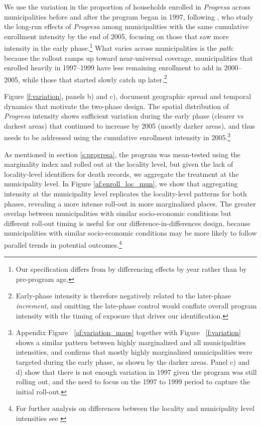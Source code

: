 \documentclass[12pt]{article}
\begin{document}
\p We use the variation in the proportion of households enrolled in \textit{Progresa} across municipalities before and after the program began in 1997, following \cite{parker2023conditional}, who study the long-run effects of \textit{Progresa} among municipalities with the same cumulative enrollment intensity by the end of 2005, focusing on those that saw more intensity in the early phase.\footnote{Our specification differs from \citet{parker2023conditional} by differencing effects by year rather than by pre-program age.}  What varies across municipalities is the \textit{path}: because the rollout ramps up toward near-universal coverage, municipalities that enrolled heavily in 1997--1999 have less remaining enrollment to add in 2000--2005, while those that started slowly catch up later.\footnote{Early-phase intensity is therefore negatively related to the later-phase \textit{increment}, and omitting the late-phase control would conflate overall program intensity with the timing of exposure that drives our identification.}


\p Figure \ref{f:variation}, panels b) and c), document geographic spread and temporal dynamics that motivate the two-phase design. The spatial distribution of \textit{Progresa} intensity shows sufficient variation during the early phase (clearer vs darkest areas) that continued to increase by 2005 (mostly darker areas), and thus needs to be addressed using the cumulative enrollment intensity in 2005.\footnote{Appendix Figure ~\ref{af:variation_maps} together with Figure ~\ref{f:variation} shows a similar pattern between highly marginalized and all municipalities intensities, and confirms that mostly highly marginalized municipalities were targeted during the early phase, as shown by the darker areas. Panel c) and d) show that there is not enough variation in 1997 given the program was still rolling out, and the need to focus on the 1997 to 1999 period to capture the initial roll-out.} 

\p As mentioned in section \ref{s:progresa}, the program was mean-tested using the marginality index and rolled out at the locality level, but given the lack of locality-level identifiers for death records, we aggregate the treatment at the municipality level. In Figure \ref{af:enroll_loc_mun}, we show that aggregating intensity at the municipality level replicates 
the locality-level patterns for both phases, revealing a more intense roll-out in more marginalized places. The greater overlap between municipalities with similar socio-economic conditions but different roll-out timing is useful for our difference-in-differences design, because municipalities with similar socio-economic conditions may be more likely to follow parallel trends in potential outcomes.\footnote{For further analysis on differences between the locality and municipality level intensities see \cite{parker2023conditional}}
\end{document}
